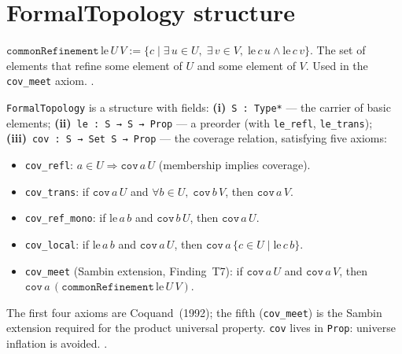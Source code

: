 \section{FormalTopology structure}
\label{sec:topology_formal}

\begin{definition}
\label{def:commonRefinement}
\leanok
$\texttt{commonRefinement}\,\text{le}\,U\,V :=
\{c \mid \exists\,u \in U,\;\exists\,v \in V,\; \text{le}\,c\,u \land
\text{le}\,c\,v\}$.
The set of elements that refine some element of $U$ and some element of $V$.
Used in the \texttt{cov\_meet} axiom.
\axiomprofile{[]}.
\end{definition}

\begin{definition}
\label{def:FormalTopology}
\leanok
{}
\texttt{FormalTopology} is a structure with fields:
\textbf{(i)}~\texttt{S : Type*} --- the carrier of basic elements;
\textbf{(ii)}~\texttt{le : S → S → Prop} --- a preorder (with
\texttt{le\_refl}, \texttt{le\_trans});
\textbf{(iii)}~\texttt{cov : S → Set S → Prop} --- the coverage
relation, satisfying five axioms:
\begin{itemize}
\item \texttt{cov\_refl}: $a \in U \Rightarrow \texttt{cov}\,a\,U$ (membership implies coverage).
\item \texttt{cov\_trans}: if $\texttt{cov}\,a\,U$ and $\forall b \in U,\; \texttt{cov}\,b\,V$, then $\texttt{cov}\,a\,V$.
\item \texttt{cov\_ref\_mono}: if $\text{le}\,a\,b$ and $\texttt{cov}\,b\,U$, then $\texttt{cov}\,a\,U$.
\item \texttt{cov\_local}: if $\text{le}\,a\,b$ and $\texttt{cov}\,a\,U$, then $\texttt{cov}\,a\,\{c \in U \mid \text{le}\,c\,b\}$.
\item \texttt{cov\_meet} (Sambin extension, Finding~T7): if $\texttt{cov}\,a\,U$ and $\texttt{cov}\,a\,V$, then $\texttt{cov}\,a\,(\texttt{commonRefinement}\,\text{le}\,U\,V)$.
\end{itemize}
The first four axioms are Coquand~(1992); the fifth (\texttt{cov\_meet})
is the Sambin extension required for the product universal property.
\texttt{cov} lives in \texttt{Prop}: universe inflation is avoided.
\axiomprofile{[]}.
\end{definition}

